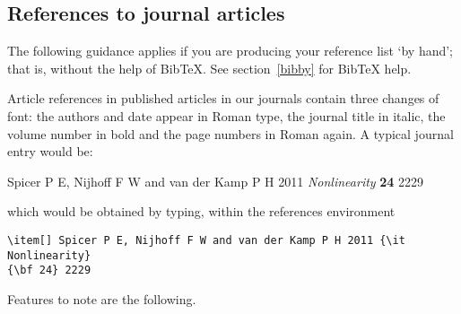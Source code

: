 \documentclass[12pt]{iopart}
\begin{document}
\subsection{References to journal articles}
The following guidance applies if you are producing your reference list `by hand'; that is,
without the help of BibTeX.  See section~\ref{bibby} for BibTeX help.

Article references in published articles in our journals contain three changes of 
font:
the authors and date appear in Roman type, the journal title in 
italic, the volume number in bold and the page numbers in Roman again. 
A typical journal entry would be:

\smallskip
\begin{harvard}
\item[] Spicer P E, Nijhoff F W and van der Kamp P H 2011 {\it Nonlinearity} {\bf 24} 2229
\end{harvard}
\smallskip

\noindent which would be obtained by typing, within the references
environment 
\small\begin{verbatim}
\item[] Spicer P E, Nijhoff F W and van der Kamp P H 2011 {\it Nonlinearity} 
{\bf 24} 2229
\end{verbatim}\normalsize

\noindent Features to note are the following.
\end{document}
